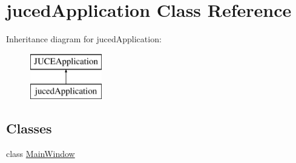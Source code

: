 \hypertarget{classjuced_application}{\section{juced\-Application Class Reference}
\label{classjuced_application}
}
Inheritance diagram for juced\-Application\-:\begin{figure}[H]
\begin{center}
\leavevmode
\includegraphics[height=2.000000cm]{classjuced_application}
\end{center}
\end{figure}
\subsection*{Classes}
\begin{DoxyCompactItemize}
\item 
class \hyperlink{classjuced_application_1_1_main_window}{Main\-Window}
\end{DoxyCompactItemize}
